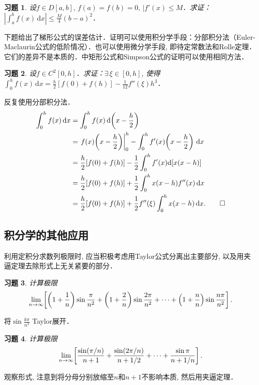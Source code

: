 \documentclass[11pt,a4paper]{ctexart}
\makeatletter
\theoremstyle{thmseries} %
\theoremstyle{exerseries}
\newtheorem{exer}{习题}[section]
\renewenvironment{proof}[1][\proofname]{\par
  \pushQED{\qed}%
  \normalfont \topsep6\p@\@plus6\p@\relax
  \trivlist
  \item[\hskip\labelsep
        \itshape
    #1\@addpunct{}]\ignorespaces
}{%
  \popQED\endtrivlist\@endpefalse
}
\newenvironment{sol}{\begin{proof}[\bfseries\upshape 解\quad]}{\end{proof}}
\newenvironment{pf}{\begin{proof}[\bfseries\upshape 证\quad]}{\end{proof}}
\newcommand{\bra}[1]{\mathopen{}\left(#1\right)}
\newcommand{\sbra}[1]{\mathopen{}\left[#1\right]}
\renewcommand{\d}{\mathrm{d}}
\def \nti {\mathnormal{n}\to\infty}
\makeatother
\begin{document}
\begin{exer}
	设$f\in D[a,b],\,f(a)=f(b)=0,\,|f'(x)\leq M$．求证：$\left|\int_{a}^{b}f(x)\,\d x\right|\leq\frac{M}{4}(b-a)^2$．
\end{exer}

下题给出了梯形公式的误差估计．证明可以使用积分学手段：分部积分法（Euler-Maclaurin公式的低阶情况）．也可以使用微分学手段, 即待定常数法和Rolle定理．它们的差异不是本质的．中矩形公式和Simpson公式的证明可以使用相同方法．
\begin{exer}
	设$f\in C^2[0,h]$．求证：$\exists\,\xi\in[0,h]$, 使得$\int_{0}^{h}f(x)\,\d x=\frac{h}{2}[f(0)+f(h)]-\frac{1}{12}f''(\xi)h^3$．
\end{exer}
\begin{pf}
	反复使用分部积分法．
	\begin{align*}
		\int_{0}^{h}f(x)\,\d x&=\int_{0}^{h}f(x)\,\d\bra{x-\frac{h}{2}}\\
		&=\left.f(x)\bra{x-\frac{h}{2}}\right|_0^h-\int_{0}^{h}f'(x)\bra{x-\frac{h}{2}}\,\d x\\
		&=\frac{h}{2}[f(0)+f(h)]-\frac{1}{2}\int_{0}^{h}f'(x)\d[x(x-h)]\\
		&=\frac{h}{2}[f(0)+f(h)]+\frac{1}{2}\int_{0}^{h}x(x-h)f''(x)\,\d x\\
		&=\frac{h}{2}[f(0)+f(h)]+\frac{1}{2}f''(\xi)\int_{0}^{h}x(x-h)\,\d x.\qedhere
	\end{align*}
\end{pf}


\subsection{积分学的其他应用}
利用定积分求数列极限时, 应当积极考虑用Taylor公式分离出主要部分, 以及用夹逼定理去除形式上无关紧要的部分．
\begin{exer}
	计算极限
	\[\lim_{\nti}\sbra{\bra{1+\frac{1}{n}}\sin\frac{\pi}{n^2}+\bra{1+\frac{2}{n}}\sin\frac{2\pi}{n^2}+\cdots+\bra{1+\frac{n}{n}}\sin\frac{n\pi}{n^2}}.\]
\end{exer}
\begin{sol}
	将$\sin\frac{k\pi}{n^2}$ Taylor展开．
\end{sol}

\begin{exer}
	计算极限
	\[\lim_{\nti}\sbra{\frac{\sin(\pi/n)}{n+1}+\frac{\sin(2\pi/n)}{n+1/2}+\cdots+\frac{\sin\pi}{n+1/n}}.\]
\end{exer}
\begin{sol}
	观察形式, 注意到将分母分别放缩至$n$和$n+1$不影响本质, 然后用夹逼定理．
\end{sol}
\end{document}

